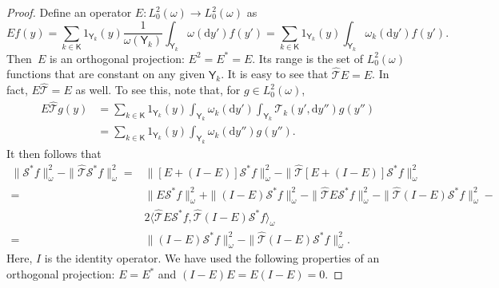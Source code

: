 \documentclass[12pt]{article}
\newcommand{\df}{\mathrm{d}}
\newcommand{\Y}{\mathsf{Y}}
\newcommand{\Mtk}{\mtkfont{T}}
\newcommand{\mtkfont}{\mathcal}
\begin{document}
\begin{proof}
	Define an operator $E: L_0^2(\omega) \to L_0^2(\omega)$ as
	\begin{equation} \nonumber
		Ef(y) = \sum_{k \in \mathsf{K}} 1_{\Y_k}(y) \frac{1}{\omega(\Y_k)} \int_{\Y_k} \omega(\df y') f(y') = \sum_{k \in \mathsf{K}} 1_{\Y_k}(y) \int_{\Y_k} \omega_k(\df y') f(y').
	\end{equation}
	Then~$E$ is an orthogonal projection: $E^2 = E^* = E$.
	Its range is the set of $L^2_0(\omega)$ functions that are constant on any given $\Y_k$.
	It is easy to see that $\hat{\Mtk }E = E$.
	In fact, $E\hat{\Mtk } = E$ as well.
	To see this, note that, for $g \in L_0^2(\omega)$,
	\[
	\begin{aligned}
		E \hat{\Mtk } g(y) &= \sum_{k \in \mathsf{K}} 1_{\Y_k}(y) \int_{\Y_k} \omega_k(\df y') \int_{\Y_k} \Mtk _k(y', \df y'') g(y'') \\
		&= \sum_{k \in \mathsf{K}} 1_{\Y_k}(y) \int_{\Y_k} \omega_k(\df y'') g(y'').
	\end{aligned}
	\]
	It then follows that 
	\begin{equation} \label{eq:ET}
		\begin{aligned}
			\|\mtkfont{S}^*f\|_{\omega}^2 - \|\hat{\Mtk } \mtkfont{S}^* f\|_{\omega}^2 =& \|[E + (I-E)] \mtkfont{S}^*f\|_{\omega}^2 - \|\hat{\Mtk } [E + (I-E)] \mtkfont{S}^* f\|_{\omega}^2 \\
			=& \|E\mtkfont{S}^*f \|_{\omega}^2 + \|(I-E) \mtkfont{S}^* f\|_{\omega}^2 - \|\hat{\Mtk } E \mtkfont{S}^* f \|_{\omega}^2 - \|\hat{\Mtk } (I-E) \mtkfont{S}^* f \|_{\omega}^2 - \\
			& 2 \langle \hat{\Mtk } E \mtkfont{S}^*f, \hat{\Mtk } (I - E)  \mtkfont{S}^* f \rangle_{\omega} \\
			=& \|(I-E) \mtkfont{S}^* f\|_{\omega}^2 - \|\hat{\Mtk } (I-E) \mtkfont{S}^* f \|_{\omega}^2.
		\end{aligned}
	\end{equation}
	Here, $I$ is the identity operator.
	{ We have used the following properties of an orthogonal projection: $E = E^*$ and $(I-E)E = E(I-E) = 0$.}
	

\end{proof}
\end{document}
